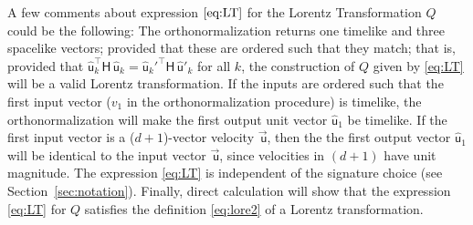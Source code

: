 \documentclass{article}
\newcommand{\metric}{\mathsf{H}}
\newcommand\upvec[1]{\!\vec{\,\mathrm{#1}}}
\newcommand{\Lvec}[1]{\upvec{\mathsf{#1}}} %
\newcommand{\Lhat}[1]{\hat{\mathsf{#1}}} %
\newcommand{\plus}{\!+\!} %
\newcommand{\secref}[1]{Section~\ref{#1}}
\begin{document}
A few comments about expression $\eqref{eq:LT}$ for the Lorentz Transformation $Q$ could be the following:
The orthonormalization returns one timelike and three spacelike vectors;
provided that these are ordered such that they match; that is, provided that $\Lhat{u}_k^\top\metric\,\Lhat{u}_k=\Lhat{u}_k'^\top\metric\,\Lhat{u}'_k$ for all $k$, the construction of $Q$ given by \eqref{eq:LT} will be a valid Lorentz transformation.
If the inputs are ordered such that the first input vector ($v_1$ in the orthonormalization procedure) is timelike, the orthonormalization will make the first output unit vector $\Lhat{u}_1$ be timelike.
If the first input vector is a ($d\plus1$)-vector velocity $\Lvec{u}$, then the the first output vector $\Lhat{u}_1$ will be identical to the input vector $\Lvec{u}$, since velocities in $(d\plus1)$ have unit magnitude.
The expression \eqref{eq:LT} is independent of the signature choice (see \secref{sec:notation}).
Finally, direct calculation will show that the expression \eqref{eq:LT} for $Q$ satisfies the definition \eqref{eq:lore2} of a Lorentz transformation.
\end{document}
